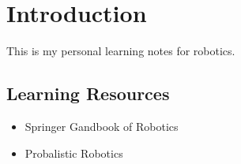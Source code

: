 \chapter{Introduction}

This is my personal learning notes for robotics.

\section{Learning Resources}
\begin{itemize}
	\item Springer Gandbook of Robotics \cite{siciliano2008springer}
	\item Probalistic Robotics \cite{thrun2006probalistic}
\end{itemize}

\todo{}